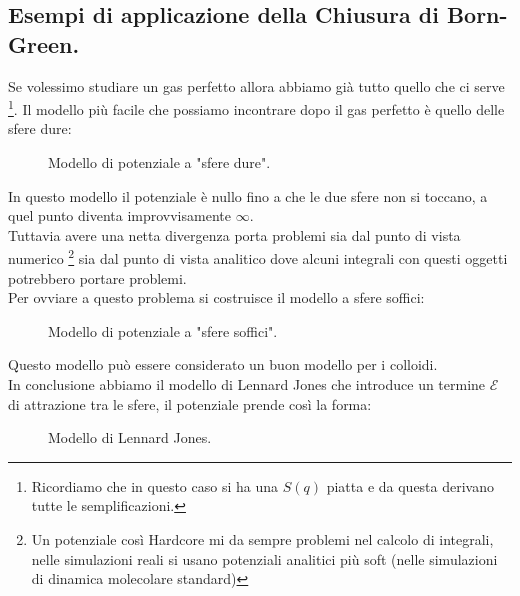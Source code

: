 \subsection{Esempi di applicazione della Chiusura di Born-Green.}
\label{subsec:Esempi di applicazione della Chiusura di Born-Green.}
Se volessimo studiare un gas perfetto allora abbiamo già tutto quello che ci serve \footnote{Ricordiamo che in questo caso si ha una $S(q)$ piatta e da questa derivano tutte le semplificazioni.}. Il modello più facile che possiamo incontrare dopo il gas perfetto è quello delle sfere dure:
\begin{figure}[H]
    \centering
    \caption{Modello di potenziale a "sfere dure".}
    \label{fig:sfere-dure-u}
\end{figure}
\noindent
In questo modello il potenziale è nullo fino a che le due sfere non si toccano, a quel punto diventa improvvisamente $\infty$.\\
Tuttavia avere una netta divergenza porta problemi sia dal punto di vista numerico \footnote{Un potenziale così Hardcore mi da sempre problemi nel calcolo di integrali, nelle simulazioni reali si usano potenziali analitici più soft (nelle simulazioni di dinamica molecolare standard)} sia dal punto di vista analitico dove alcuni integrali con questi oggetti potrebbero portare problemi. \\
Per ovviare a questo problema si costruisce il modello a sfere soffici:
\begin{figure}[H]
    \centering
    \caption{Modello di potenziale a "sfere soffici".}
    \label{fig:sfere-soffici-u}
\end{figure}
\noindent
Questo modello può essere considerato un buon modello per i colloidi.\\
In conclusione abbiamo il modello di Lennard Jones che introduce un termine $\mathcal{E}$ di attrazione tra le sfere, il potenziale prende così la forma:
\begin{figure}[H]
    \centering
    \caption{Modello di Lennard Jones.}
    \label{fig:sfere-lennard-jones}
\end{figure}
\noindent
